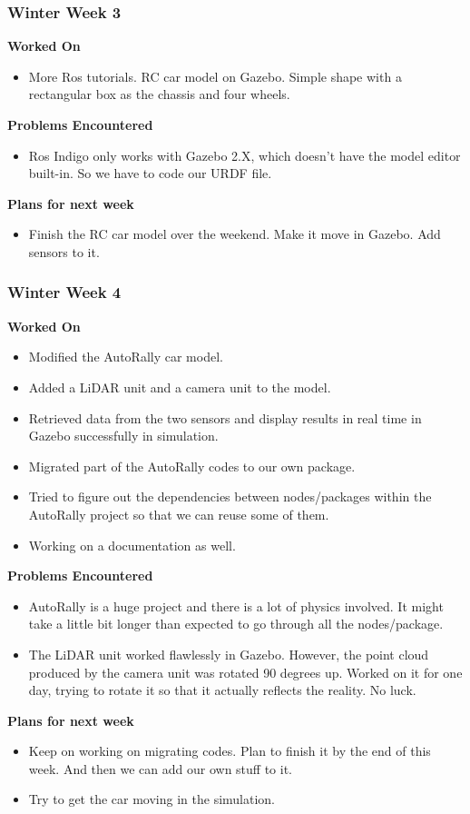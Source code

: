 \documentclass[compsoc,draftclsnofoot,onecolumn,10pt]{IEEEtran}
\begin{document}
\subsubsection*{Winter Week 3}
\textbf{Worked On}
\begin{itemize}
  \item More Ros tutorials. RC car model on Gazebo. Simple shape with a
  rectangular box as the chassis and four wheels.
\end{itemize}
\textbf{Problems Encountered}
\begin{itemize}
  \item Ros Indigo only works with Gazebo 2.X, which doesn't have the
  model editor built-in. So we have to code our URDF file.
\end{itemize}
\textbf{Plans for next week}
\begin{itemize}
  \item Finish the RC car model over the weekend. Make it move in
  Gazebo. Add sensors to it.
\end{itemize}


\subsubsection*{Winter Week 4}
\textbf{Worked On}
\begin{itemize}
  \item Modified the AutoRally car model.
  \item Added a LiDAR unit and a camera unit to the model.
  \item Retrieved data from the two sensors and display
  results in real time in Gazebo successfully in simulation.
  \item Migrated part of the AutoRally codes to our own package.
  \item Tried to figure out the dependencies between nodes/packages
  within the AutoRally project so that we can reuse some of them.
  \item Working on a documentation as well.
\end{itemize}
\textbf{Problems Encountered}
\begin{itemize}
  \item AutoRally is a huge project and there is a lot of physics
  involved. It might take a little bit longer than expected to go
  through all the nodes/package.
  \item The LiDAR unit worked flawlessly in Gazebo. However, the point
  cloud produced by the camera unit was rotated 90 degrees up. Worked
  on it for one day, trying to rotate it so that it actually reflects
  the reality. No luck.
\end{itemize}
\textbf{Plans for next week}
\begin{itemize}
  \item Keep on working on migrating codes. Plan to finish it by the end
  of this week. And then we can add our own stuff to it.
  \item Try to get the car moving in the simulation.
\end{itemize}
\end{document}

